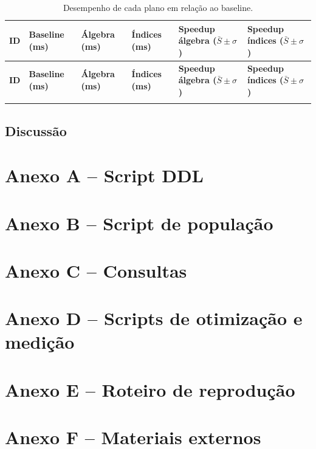 \documentclass[12pt,a4paper]{article}
\begin{document}
{\small
\setlength{\tabcolsep}{4pt}
\begin{longtable}{>{\raggedright\arraybackslash}p{0.9cm}
                  >{\raggedleft\arraybackslash}p{2.0cm}
                  >{\raggedleft\arraybackslash}p{2.0cm}
                  >{\raggedleft\arraybackslash}p{2.0cm}
                  >{\raggedleft\arraybackslash}p{2.6cm}
                  >{\raggedleft\arraybackslash}p{2.6cm}}
\caption{Desempenho de cada plano em relação ao baseline.}\label{tab:resultados}\\
\toprule
\textbf{ID} & \textbf{Baseline (ms)} & \textbf{Álgebra (ms)} & \textbf{Índices (ms)} & \textbf{Speedup álgebra ($\bar{S}\pm\sigma$)} & \textbf{Speedup índices ($\bar{S}\pm\sigma$)}\\
\midrule
\endfirsthead
\toprule
\textbf{ID} & \textbf{Baseline (ms)} & \textbf{Álgebra (ms)} & \textbf{Índices (ms)} & \textbf{Speedup álgebra ($\bar{S}\pm\sigma$)} & \textbf{Speedup índices ($\bar{S}\pm\sigma$)}\\
\midrule
\endhead
\bottomrule
\endfoot
 & & & & & \\
\end{longtable}
}

\subsection{Discussão}

\renewcommand{\refname}{Referências}



\section*{Anexo A -- Script DDL}

\section*{Anexo B -- Script de população}

\section*{Anexo C -- Consultas}

\section*{Anexo D -- Scripts de otimização e medição}

\section*{Anexo E -- Roteiro de reprodução}

\section*{Anexo F -- Materiais externos}
\end{document}
